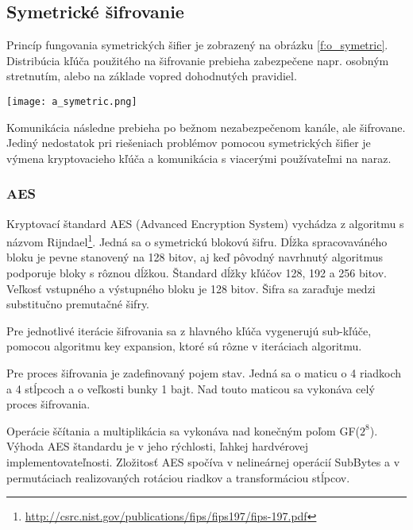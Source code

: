\documentclass[12pt,a4wide,oneside,openright]{report}
\begin{document}

\subsection{Symetrické šifrovanie} \label{s_cpyt_symetric}
Princíp fungovania symetrických šifier je zobrazený na obrázku \ref{f:o_symetric}. Distribúcia kľúča použitého na šifrovanie prebieha zabezpečene napr. osobným stretnutím, alebo na základe vopred dohodnutých pravidiel.

\begin{figure*}[!hbt]
	\centering
	\texttt{[image: a\_symetric.png]}
	\caption{Princíp fungovania symetrických šifier. \cite{cryptographyhandbook}}
	\label{f:o_symetric}
\end{figure*}

Komunikácia následne prebieha po bežnom nezabezpečenom kanále, ale šifrovane. Jediný nedostatok pri riešeniach problémov pomocou symetrických šifier je výmena kryptovacieho kľúča a komunikácia s viacerými používateľmi na naraz.

\subsubsection{AES} %
Kryptovací štandard AES (Advanced Encryption System) vychádza z algoritmu s názvom Rijndael\footnote{\url{http://csrc.nist.gov/publications/fips/fips197/fips-197.pdf}}. Jedná sa o symetrickú blokovú šifru. Dĺžka spracovaváného bloku je pevne stanovený na 128 bitov, aj keď pôvodný navrhnutý algoritmus podporuje bloky s rôznou dĺžkou. Štandard dĺžky kľúčov 128, 192 a 256 bitov. Veľkosť vstupného a výstupného bloku je 128 bitov. Šifra sa zaraďuje medzi substitučno premutačné šifry.

Pre jednotlivé iterácie šifrovania sa z hlavného kľúča vygenerujú sub-kľúče, pomocou algoritmu key expansion, ktoré sú rôzne v iteráciach algoritmu.

Pre proces šifrovania je zadefinovaný pojem stav. Jedná sa o maticu o 4 riadkoch a 4 stĺpcoch a o veľkosti bunky 1 bajt. Nad touto maticou sa vykonáva celý proces šifrovania.

Operácie ščítania a multiplikácia sa vykonáva nad konečným poľom GF($2^8$).
Výhoda AES štandardu je v jeho rýchlosti, ľahkej hardvérovej  implementovateľnosti. Zložitosť AES spočíva v nelineárnej operácií SubBytes a v permutáciach realizovaných rotáciou riadkov a transformáciou stĺpcov.
\end{document}
